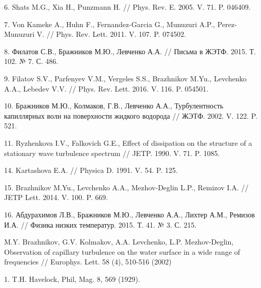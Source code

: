 \begin{thebibliography}{99}
6. Shats M.G., Xia H., Punzmann H. // Phys. Rev. E. 2005. V. 71. P. 046409.

7. Von Kameke A., Huhn F., Fernandez-Garcia G., Munuzuri A.P., Perez-Munuzuri V. // Phys. Rev. Lett. 2011. V. 107. P. 074502.

8. Филатов С.В., Бражников М.Ю., Левченко А.А. // Письма в ЖЭТФ. 2015. Т. 102. № 7. С. 486.

9. Filatov S.V., Parfenyev V.M., Vergeles S.S., Brazhnikov M.Yu., Levchenko A.A., Lebedev V.V. // Phys. Rev. Lett. 2016. V. 116. P. 054501.

10. Бражников М.Ю., Колмаков, Г.В., Левченко А.А., Турбулентность капиллярных волн на поверхности жидкого водорода // ЖЭТФ. 2002. V. 122. P. 521.

11. Ryzhenkova I.V., Falkovich G.E., Effect of dissipation on the structure of a stationary wave turbulence spectrum // JETP. 1990. V. 71. P. 1085.



14. Kartashova E.A. // Physica D. 1991. V. 54. P. 125.

15. Brazhnikov M.Yu., Levchenko A.A., Mezhov-Deglin L.P., Remizov I.A. // JETP Lett. 2014. V. 100. P. 669.

16. Абдурахимов Л.В., Бражников М.Ю., Левченко А.А., Лихтер А.М., Ремизов И.А. // Физика низких температур. 2015. Т. 41. № 3. С. 215.


M.Y. Brazhnikov, G.V. Kolmakov, A.A. Levchenko, L.P. Mezhov-Deglin, Observation of capillary turbulence on the water surface in a wide range of frequencies // Europhys. Lett. 58 (4), 510-516 (2002)


1. T.H. Havelock, Phil, Mag. 8, 569 (1929).


\end{thebibliography}
